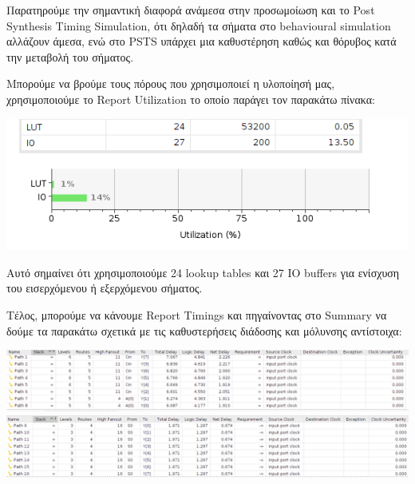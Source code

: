 \documentclass[11pt, a4paper]{report}
\begin{document}
Παρατηρούμε την σημαντική διαφορά ανάμεσα στην προσωμοίωση και το Post Synthesis Timing Simulation, ότι δηλαδή τα σήματα στο behavioural simulation αλλάζουν άμεσα, ενώ στο PSTS υπάρχει μια καθυστέρηση καθώς και θόρυβος κατά την μεταβολή του σήματος.

Μπορούμε να βρούμε τους πόρους που χρησιμοποιεί η υλοποίησή μας, χρησιμοποιούμε το Report Utilization το οποίο παράγει τον παρακάτω πίνακα:
\begin{center}
	\includegraphics[width=\textwidth]{./images/alu-1/Utilization.png}
\end{center}

Αυτό σημαίνει ότι χρησιμοποιούμε 24 lookup tables και 27 IO buffers για ενίσχυση του εισερχόμενου ή εξερχόμενου σήματος.

Τέλος, μπορούμε να κάνουμε Report Timings και πηγαίνοντας στο Summary να δούμε τα παρακάτω σχετικά με τις καθυστερήσεις διάδοσης και μόλυνσης αντίστοιχα:
\begin{center}
	\includegraphics[width=\textwidth]{./images/alu-1/Setup_Time_Summury.png}
	\includegraphics[width=\textwidth]{./images/alu-1/Hold_Time_Summury.png}
\end{center}
\end{document}
